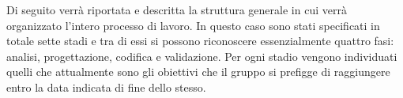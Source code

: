 Di seguito verrà riportata e descritta la struttura generale in cui verrà organizzato l'intero processo di lavoro. In questo caso sono stati specificati in totale sette stadi e tra di essi si possono riconoscere essenzialmente quattro fasi: analisi, progettazione, codifica e validazione. Per ogni stadio vengono individuati quelli che attualmente sono gli obiettivi che il gruppo \Gruppo{} si prefigge di raggiungere entro la data indicata di fine dello stesso.\\